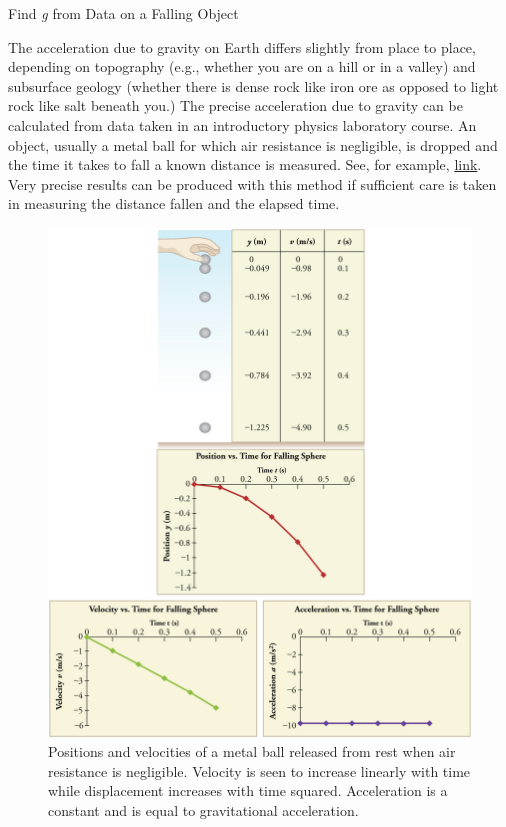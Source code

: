 \documentclass[
]{book}
\begin{document}
\hypertarget{fs-id3526422}{}
Find \emph{g} from Data on a Falling Object

The acceleration due to gravity on Earth differs slightly from place to
place, depending on topography (e.g., whether you are on a hill or in a
valley) and subsurface geology (whether there is dense rock like iron
ore as opposed to light rock like salt beneath you.) The precise
acceleration due to gravity can be calculated from data taken in an
introductory physics laboratory course. An object, usually a metal ball
for which air resistance is negligible, is dropped and the time it takes
to fall a known distance is measured. See, for example,
\protect\hyperlink{import-auto-id4097254}{link}. Very precise
results can be produced with this method if sufficient care is taken in
measuring the distance fallen and the elapsed time.

\begin{figure}
\hypertarget{import-auto-id4097254}{%
\centering
\includegraphics{images/Figure_02_06_02.jpg}
\caption{Positions and velocities of a metal ball released from rest when air
resistance is negligible. Velocity is seen to increase linearly with
time while displacement increases with time squared. Acceleration is a
constant and is equal to gravitational
acceleration.}\label{import-auto-id4097254}
}
\end{figure}
\end{document}
